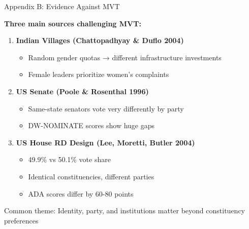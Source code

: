 \documentclass[10pt]{beamer}
\begin{document}
\begin{frame}[label=evidence-against]{Appendix B: Evidence Against MVT}
\hypertarget{evidence-against}{}

\textbf{Three main sources challenging MVT:}

\begin{enumerate}
\item \textbf{Indian Villages (Chattopadhyay \& Duflo 2004)}
\begin{itemize}
\item Random gender quotas → different infrastructure investments
\item Female leaders prioritize women's complaints
\end{itemize}

\item \textbf{US Senate (Poole \& Rosenthal 1996)}
\begin{itemize}
\item Same-state senators vote very differently by party
\item DW-NOMINATE scores show huge gaps
\end{itemize}

\item \textbf{US House RD Design (Lee, Moretti, Butler 2004)}
\begin{itemize}
\item 49.9\% vs 50.1\% vote share
\item Identical constituencies, different parties
\item ADA scores differ by 60-80 points 
\end{itemize}
\end{enumerate}


\alert{Common theme:} Identity, party, and institutions matter beyond constituency preferences


\small{\hyperlink{challenge-2}{}}
\end{frame}
\end{document}
